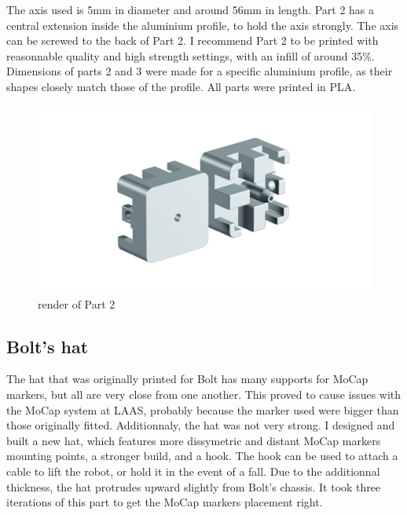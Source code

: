 \documentclass[a4paper,10pt]{article}
\begin{document}
The axis used is 5mm in diameter and around 56mm in length. Part 2 has a central extension inside the aluminium profile, to hold the axis strongly. The axis can be screwed to the back of Part 2. I recommend Part 2 to be printed with reasonnable quality and high strength settings, with an infill of around 35\%. Dimensions of parts 2 and 3 were made for a specific aluminium profile, as their shapes closely match those of the profile. All parts were printed in PLA.

\begin{figure}[H]
\centering
  \includegraphics[width=\linewidth, angle=0, scale=0.8]{./images/render_stand.png}
  \caption{render of Part 2}
\end{figure}




\subsection{Bolt's hat}
The hat that was originally printed for Bolt has many supports for MoCap markers, but all are very close from one another. This proved to cause issues with the MoCap system at LAAS, probably because the marker used were bigger than those originally fitted. Additionnaly, the hat was not very strong. I designed and built a new hat, which features more dissymetric and distant MoCap markers mounting points, a stronger build, and a hook. The hook can be used to attach a cable to lift the robot, or hold it in the event of a fall. Due to the additionnal thickness, the hat protrudes upward slightly from Bolt's chassis. It took three iterations of this part to get the MoCap markers placement right.
\end{document}

